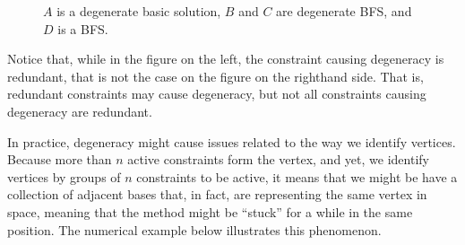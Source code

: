\begin{figure}
	\caption{$A$ is a degenerate basic solution, $B$ and $C$ are degenerate BFS, and $D$ is a BFS.} \label{p1c3:fig:figure1}
\end{figure} 

Notice that, while in the figure on the left, the constraint causing degeneracy is redundant, that is not the case on the figure on the righthand side. That is, redundant constraints may cause degeneracy, but not all constraints causing degeneracy are redundant.

In practice, degeneracy might cause issues related to the way we identify vertices. Because more than $n$ active constraints form the vertex, and yet, we identify vertices by groups of $n$ constraints to be active, it means that we might be have a collection of adjacent bases that, in fact, are representing the same vertex in space, meaning that the method might be ``stuck'' for a while in the same position. The numerical example below illustrates this phenomenon. 

